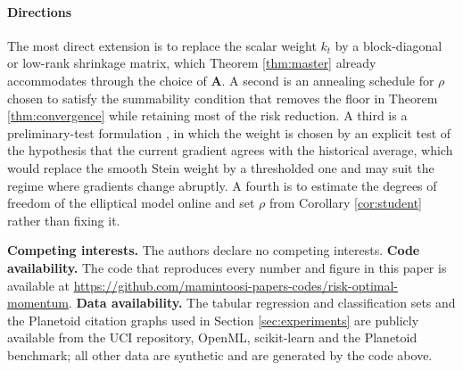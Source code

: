 \documentclass[pdflatex,sn-mathphys-num]{sn-jnl}%
\theoremstyle{thmstyleone}%
\theoremstyle{thmstyletwo}%
\theoremstyle{thmstylethree}%
\newcommand{\rev}[1]{#1}
\begin{document}
\paragraph{Directions}

The most direct extension is to replace the scalar weight $k_t$ by a block-diagonal or low-rank shrinkage matrix, which Theorem \ref{thm:master} already accommodates through the choice of $\bm A$. A second is an annealing schedule for $\rho$ chosen to satisfy the summability condition that removes the floor in Theorem \ref{thm:convergence} while retaining most of the risk reduction. A third is a preliminary-test formulation \cite{saleh2006, judge1978}, in which the weight is chosen by an explicit test of the hypothesis that the current gradient agrees with the historical average, which would replace the smooth Stein weight by a thresholded one and may suit the regime where gradients change abruptly. A fourth is to estimate the degrees of freedom of the elliptical model online and set $\rho$ from Corollary \ref{cor:student} rather than fixing it.

\backmatter



\rev{\textbf{Competing interests.}} The authors declare no competing interests. \rev{\textbf{Code availability.}} The code that reproduces every number and figure in this paper is available at \url{https://github.com/mamintoosi-papers-codes/risk-optimal-momentum}. \rev{\textbf{Data availability.} The tabular regression and classification sets and the Planetoid citation graphs used in Section \ref{sec:experiments} are publicly available from the UCI repository, OpenML, scikit-learn and the Planetoid benchmark; all other data are synthetic and are generated by the code above.}
\end{document}
